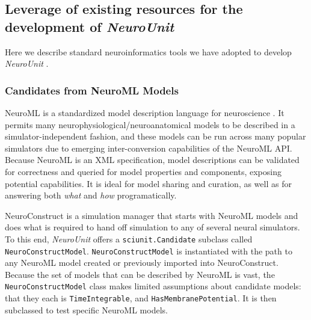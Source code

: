 \documentclass[11pt,letterpaper]{article}
\begin{document}
\subsection{Leverage of existing resources for the development of \textit{NeuroUnit}}
Here we describe standard neuroinformatics tools we have adopted to develop \textit{NeuroUnit} \cite{neurounit_url}.  

\subsubsection{Candidates from NeuroML Models}\label{sec:neuroml_candidates}
NeuroML is a standardized model description language for neuroscience \cite{gleeson_neuroml:_2010}. It permits many neurophysiological/neuroanatomical models to be described in a simulator-independent fashion, and these models can be run across many popular simulators due to emerging inter-conversion capabilities of the NeuroML API.  Because NeuroML is an XML specification, model descriptions can be validated for correctness and queried for model properties and components, exposing potential capabilities.  It is ideal for model sharing and curation, as well as for answering both \textit{what} and \textit{how} programatically.  

NeuroConstruct \cite{neuroconstruct_url,gleeson_neuroconstruct:_2007} is a simulation manager that starts with NeuroML models and does what is required to hand off simulation to any of several neural simulators. To this end, \textit{NeuroUnit} offers a \verb|sciunit.Candidate| subclass called \verb|NeuroConstructModel|. \verb|NeuroConstructModel| is instantiated with the path to any NeuroML model created or previously imported into NeuroConstruct.  Because the set of models that can be described by NeuroML is vast, the \verb|NeuroConstructModel| class makes limited assumptions about candidate models: that they each is \verb|TimeIntegrable|, and \verb|HasMembranePotential|.  It is then subclassed to test specific NeuroML models. 
\end{document}

